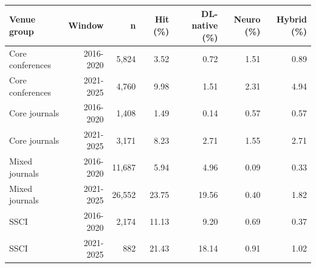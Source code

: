 \begin{tabular}{@{}lrrrrrr@{}}
\toprule
Venue group & Window & n & Hit (\%) & DL-native (\%) & Neuro (\%) & Hybrid (\%) \\
\midrule
Core conferences & 2016-2020 & 5,824 & 3.52 & 0.72 & 1.51 & 0.89 \\
Core conferences & 2021-2025 & 4,760 & 9.98 & 1.51 & 2.31 & 4.94 \\
Core journals & 2016-2020 & 1,408 & 1.49 & 0.14 & 0.57 & 0.57 \\
Core journals & 2021-2025 & 3,171 & 8.23 & 2.71 & 1.55 & 2.71 \\
Mixed journals & 2016-2020 & 11,687 & 5.94 & 4.96 & 0.09 & 0.33 \\
Mixed journals & 2021-2025 & 26,552 & 23.75 & 19.56 & 0.40 & 1.82 \\
SSCI & 2016-2020 & 2,174 & 11.13 & 9.20 & 0.69 & 0.37 \\
SSCI & 2021-2025 & 882 & 21.43 & 18.14 & 0.91 & 1.02 \\
\bottomrule
\end{tabular}
